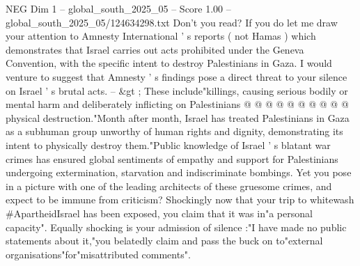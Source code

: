 \begin{textsample}{NEG Dim 1 – global\_south\_2025\_05 – Score 1.00 – global\_south\_2025\_05/124634298.txt}
Don't you read?
If you do let me draw your attention to Amnesty International ' s reports ( not Hamas ) which demonstrates that Israel carries out acts prohibited under the Geneva Convention, with the specific intent to destroy Palestinians in Gaza.
I would venture to suggest that Amnesty ' s findings pose a direct threat to your silence on Israel ' s brutal acts. -- \&gt ; These include"killings, causing serious bodily or mental harm and deliberately inflicting on Palestinians @ @ @ @ @ @ @ @ @ @ physical destruction."Month after month, Israel has treated Palestinians in Gaza as a subhuman group unworthy of human rights and dignity, demonstrating its intent to physically destroy them."Public knowledge of Israel ' s blatant war crimes has ensured global sentiments of empathy and support for Palestinians undergoing extermination, starvation and indiscriminate bombings.
Yet you pose in a picture with one of the leading architects of these gruesome crimes, and expect to be immune from criticism?
Shockingly now that your trip to whitewash \#ApartheidIsrael has been exposed, you claim that it was in"a personal capacity".
Equally shocking is your admission of silence :"I have made no public statements about it,"you belatedly claim and pass the buck on to"external organisations"for"misattributed comments".

\end{textsample}
